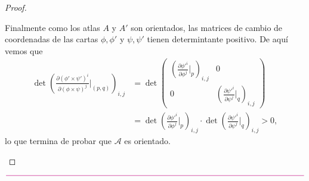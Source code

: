 \documentclass[11pt]{article}
\newcommand{\paint}[1]{\color{color}{#1}}
\begin{document}
\begin{proof}
\begin{itemize}[listparindent = \parindent]
Finalmente como los atlas $A$ y $A'$ son orientados, las matrices de cambio de coordenadas de las cartas $\phi,\phi'$ y $\psi,\psi'$ tienen determintante positivo. De aquí vemos que
\begin{align*}
\det\left(\frac{\partial (\phi' \times \psi')^i}{\partial (\phi \times \psi)^j}\Big|_{(p,q)}\right)_{i,j} &= \det \begin{pmatrix}
\left(\frac{\partial {\phi'}^i}{\partial \phi^j}\Big|_p\right)_{i,j} & 0\\
0 & \left(\frac{\partial {\psi'}^{i}}{\partial \psi^{j}}\Big|_q\right)_{i,j}
\end{pmatrix}\\
& = \det \left(\frac{\partial {\phi'}^i}{\partial \phi^j}\Big|_p\right)_{i,j} \cdot \det \left(\frac{\partial {\psi'}^{i}}{\partial \psi^{j}}\Big|_q\right)_{i,j} > 0,
\end{align*}
lo que termina de probar que $\mathcal{A}$ es orientado.
\end{itemize}
\end{proof}

\begin{center}
$\paint{
\rule{400pt}{0.5pt}
}$
\vspace{10pt}
\end{center}
\end{document}
